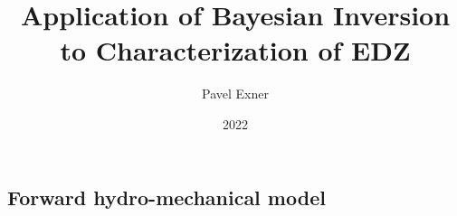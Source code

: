 \documentclass{article}
\title{Application of Bayesian Inversion to Characterization of EDZ}
\author{Pavel Exner}
\date{2022}
\begin{document}
\maketitle

% 
% 
% 
% 
% 


\subsection{Forward hydro-mechanical model}
\end{document}
